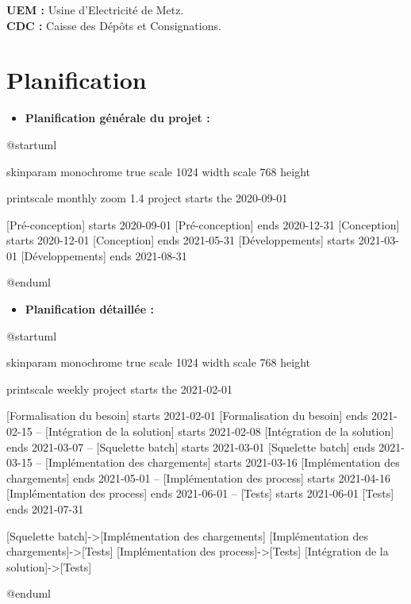 \documentclass[a4paper, 12pt]{report}
\begin{document}
\vspace{1cm}
\noindent\textbf{UEM :} Usine d'Electricité de Metz.\\
\noindent\textbf{CDC :} Caisse des Dépôts et Consignations.

\chapter{Planification}
\label{appendix:planification}

\begin{itemize}
  \item \textbf{Planification générale du projet :}\\
\end{itemize}

\begin{center}
  \begin{plantuml}
    @startuml

    skinparam monochrome true
    scale 1024 width
    scale 768 height

    printscale monthly zoom 1.4
    project starts the 2020-09-01

    [Pré-conception] starts 2020-09-01
    [Pré-conception] ends 2020-12-31
    [Conception] starts 2020-12-01
    [Conception] ends 2021-05-31
    [Développements] starts 2021-03-01
    [Développements] ends 2021-08-31

    @enduml
  \end{plantuml}
\end{center}
\vspace{1cm}

\begin{itemize}
  \item \textbf{Planification détaillée :}\\
\end{itemize}

\begin{center}
  \begin{plantuml}
    @startuml

    skinparam monochrome true
    scale 1024 width
    scale 768 height

    printscale weekly
    project starts the 2021-02-01

    [Formalisation du besoin] starts 2021-02-01
    [Formalisation du besoin] ends 2021-02-15
    --
    [Intégration de la solution] starts 2021-02-08
    [Intégration de la solution] ends 2021-03-07
    --
    [Squelette batch] starts 2021-03-01
    [Squelette batch] ends 2021-03-15
    --
    [Implémentation des chargements] starts 2021-03-16
    [Implémentation des chargements] ends 2021-05-01
    --
    [Implémentation des process] starts 2021-04-16
    [Implémentation des process] ends 2021-06-01
    --
    [Tests] starts 2021-06-01
    [Tests] ends 2021-07-31

    [Squelette batch]->[Implémentation des chargements]
    [Implémentation des chargements]->[Tests]
    [Implémentation des process]->[Tests]
    [Intégration de la solution]->[Tests]

    @enduml
  \end{plantuml}
\end{center}
\end{document}
